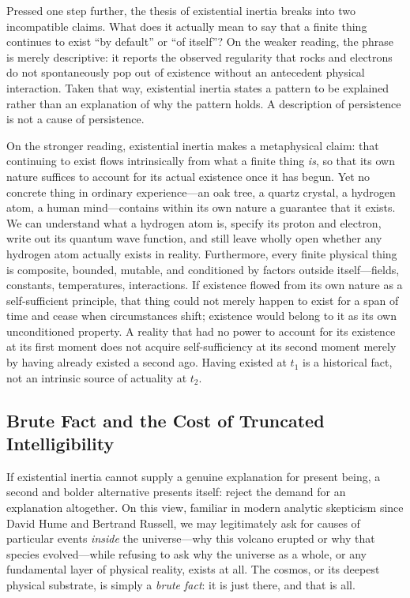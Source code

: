Pressed one step further, the thesis of existential inertia breaks into two incompatible claims. What does it actually mean to say that a finite thing continues to exist ``by default'' or ``of itself''? On the weaker reading, the phrase is merely descriptive: it reports the observed regularity that rocks and electrons do not spontaneously pop out of existence without an antecedent physical interaction. Taken that way, existential inertia states a pattern to be explained rather than an explanation of why the pattern holds. A description of persistence is not a cause of persistence.

On the stronger reading, existential inertia makes a metaphysical claim: that continuing to exist flows intrinsically from what a finite thing \emph{is}, so that its own nature suffices to account for its actual existence once it has begun. Yet no concrete thing in ordinary experience---an oak tree, a quartz crystal, a hydrogen atom, a human mind---contains within its own nature a guarantee that it exists. We can understand what a hydrogen atom is, specify its proton and electron, write out its quantum wave function, and still leave wholly open whether any hydrogen atom actually exists in reality. Furthermore, every finite physical thing is composite, bounded, mutable, and conditioned by factors outside itself---fields, constants, temperatures, interactions. If existence flowed from its own nature as a self-sufficient principle, that thing could not merely happen to exist for a span of time and cease when circumstances shift; existence would belong to it as its own unconditioned property. A reality that had no power to account for its existence at its first moment does not acquire self-sufficiency at its second moment merely by having already existed a second ago. Having existed at $t_1$ is a historical fact, not an intrinsic source of actuality at $t_2$.

\subsection{Brute Fact and the Cost of Truncated Intelligibility}

If existential inertia cannot supply a genuine explanation for present being, a second and bolder alternative presents itself: reject the demand for an explanation altogether. On this view, familiar in modern analytic skepticism since David Hume and Bertrand Russell, we may legitimately ask for causes of particular events \emph{inside} the universe---why this volcano erupted or why that species evolved---while refusing to ask why the universe as a whole, or any fundamental layer of physical reality, exists at all. The cosmos, or its deepest physical substrate, is simply a \emph{brute fact}: it is just there, and that is all.

